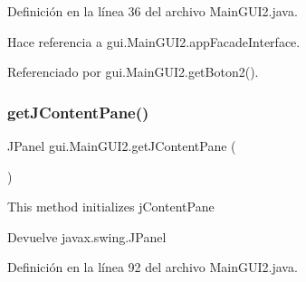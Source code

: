 Definición en la línea 36 del archivo Main\+G\+U\+I2.\+java.


\begin{DoxyCode}{0}

\end{DoxyCode}


Hace referencia a gui.\+Main\+G\+U\+I2.\+app\+Facade\+Interface.



Referenciado por gui.\+Main\+G\+U\+I2.\+get\+Boton2().

\mbox{\label{classgui_1_1MainGUI2_a3858ba493df7f97fc808f5574957a50d}} 
\subsubsection{\texorpdfstring{getJContentPane()}{getJContentPane()}}
{\footnotesize\ttfamily J\+Panel gui.\+Main\+G\+U\+I2.\+get\+J\+Content\+Pane (\begin{DoxyParamCaption}{ }\end{DoxyParamCaption})\hspace{0.3cm}{\ttfamily [private]}}

This method initializes j\+Content\+Pane

\begin{DoxyReturn}{Devuelve}
javax.\+swing.\+J\+Panel 
\end{DoxyReturn}


Definición en la línea 92 del archivo Main\+G\+U\+I2.\+java.


